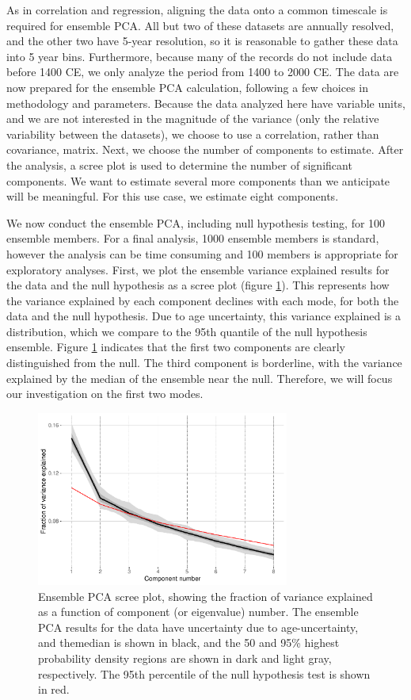 \documentclass[gchron, manuscript]{copernicus}
\begin{document}
As in correlation and regression, aligning the data onto a common timescale is required for ensemble PCA. All but two of these datasets are annually resolved, and the other two have 5-year resolution, so it is reasonable to gather these data into 5 year bins.
Furthermore, because many of the records do not include data before 1400 CE, we only analyze the period from 1400 to 2000 CE.
The data are now prepared for the ensemble PCA calculation, following a few choices in methodology and parameters.
Because the data analyzed here have variable units, and we are not interested in the magnitude of the variance (only the relative variability between the datasets), we choose to use a correlation, rather than covariance, matrix.
Next, we choose the number of components to estimate.
After the analysis, a scree plot is used to determine the number of significant components. We want to estimate several more components than we anticipate will be meaningful.
For this use case, we estimate eight components.

We now conduct the ensemble PCA, including null hypothesis testing, for 100 ensemble members.
For a final analysis, 1000 ensemble members is standard, however the analysis can be time consuming and 100 members is appropriate for exploratory analyses.
First, we plot the ensemble variance explained results for the data and the null hypothesis as a scree plot (figure \ref{fig:scree}).
This represents how the variance explained by each component declines with each mode, for both the data and the null hypothesis. Due to age uncertainty, this variance explained is a distribution, which we compare to the 95th quantile of the null hypothesis ensemble.
Figure \ref{fig:scree} indicates that the first two components are clearly distinguished from the null.
The third component is borderline, with the variance explained by the median of the ensemble near the null.
Therefore, we will focus our investigation on the first two modes.

\begin{figure}
\includegraphics[width=8.3cm]{geoChronR-paper_files/figure-latex/scree-1} \caption{Ensemble PCA scree plot, showing the fraction of variance explained as a function of component (or eigenvalue) number. The ensemble PCA results for the data have uncertainty due to age-uncertainty, and themedian is shown in black, and the 50 and 95\% highest probability density regions are shown in dark and light gray, respectively. The 95th percentile of the null hypothesis test is shown in red.}\label{fig:scree}
\end{figure}
\end{document}
